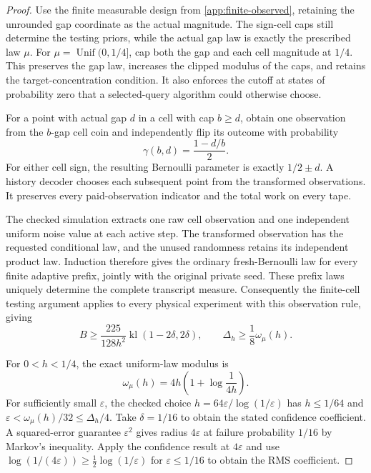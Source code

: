 \begin{proof}
Use the finite measurable design from \cref{app:finite-observed},
retaining the unrounded gap coordinate as the actual magnitude.
The sign-cell caps still determine the testing priors, while the
actual gap law is exactly the prescribed law $\mu$.
For $\mu=\operatorname{Unif}(0,1/4]$, cap both the gap and each cell
magnitude at $1/4$. This preserves the gap law, increases the clipped
modulus of the caps, and retains the target-concentration condition.
It also enforces the cutoff at states of probability zero that a
selected-query algorithm could otherwise choose.

For a point with actual gap $d$ in a cell with cap $b\ge d$, obtain
one observation from the $b$-gap cell coin and independently flip its
outcome with probability
\[
 \gamma(b,d)=\frac{1-d/b}{2}.
\]
For either cell sign, the resulting Bernoulli parameter is exactly
$1/2\pm d$. A history decoder chooses each subsequent point from the
transformed observations. It preserves every paid-observation
indicator and the total work on every tape.

The checked simulation extracts one raw cell observation and one
independent uniform noise value at each active step. The transformed
observation has the requested conditional law, and the unused
randomness retains its independent product law. Induction therefore
gives the ordinary fresh-Bernoulli law for every finite adaptive
prefix, jointly with the original private seed. These prefix laws
uniquely determine the complete transcript measure.
Consequently the finite-cell testing argument applies to every
physical experiment with this observation rule, giving
\[
 B\ge\frac{225}{128h^2}\operatorname{kl}(1-2\delta,2\delta),
 \qquad \Delta_h\ge\frac18\omega_\mu(h).
\]

For $0<h<1/4$, the exact uniform-law modulus is
\[
 \omega_\mu(h)=4h\left(1+\log\frac1{4h}\right).
\]
For sufficiently small $\varepsilon$, the checked choice
$h=64\varepsilon/\log(1/\varepsilon)$ has $h\le1/64$ and
$\varepsilon<\omega_\mu(h)/32\le\Delta_h/4$.
Take $\delta=1/16$ to obtain the stated confidence coefficient.
A squared-error guarantee $\varepsilon^2$ gives radius $4\varepsilon$
at failure probability $1/16$ by Markov's inequality.
Apply the confidence result at $4\varepsilon$ and use
$\log(1/(4\varepsilon))\ge\frac12\log(1/\varepsilon)$
for $\varepsilon\le1/16$ to obtain the RMS coefficient.
\end{proof}

